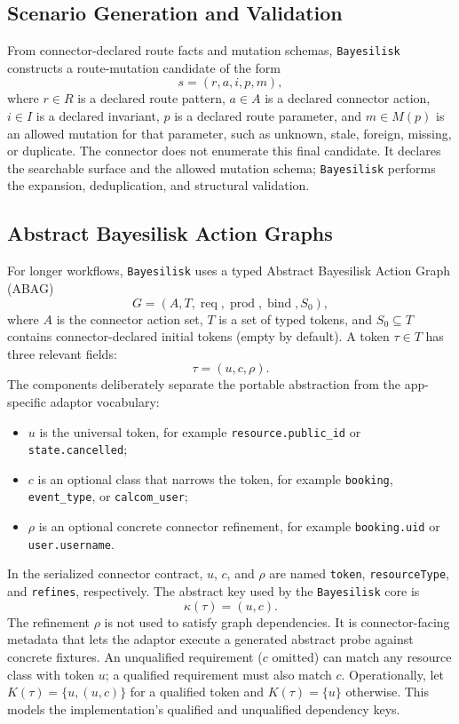 \documentclass[10pt]{article}
\newcommand{\tool}{\texttt{Bayesilisk}\xspace}
\begin{document}
\subsection{Scenario Generation and Validation}

From connector-declared route facts and mutation schemas, \tool constructs a
route-mutation candidate of the form
\[
  s = (r, a, i, p, m),
\]
where \(r \in R\) is a declared route pattern, \(a \in A\) is a declared
connector action, \(i \in I\) is a declared invariant, \(p\) is a declared route
parameter, and \(m \in M(p)\) is an allowed mutation for that parameter, such as
unknown, stale, foreign, missing, or duplicate. The connector does not enumerate
this final candidate. It declares the searchable surface and the allowed
mutation schema; \tool performs the expansion, deduplication, and structural
validation.

\subsection{Abstract Bayesilisk Action Graphs}

For longer workflows, \tool uses a typed Abstract Bayesilisk Action Graph
(ABAG)
\[
  G = (A,T,\operatorname{req},\operatorname{prod},\operatorname{bind},S_0),
\]
where \(A\) is the connector action set, \(T\) is a set of typed tokens, and
\(S_0\subseteq T\) contains connector-declared initial tokens (empty by default). A
token \(\tau \in T\) has three relevant fields:
\[
  \tau = (u,c,\rho).
\]
The components deliberately separate the portable abstraction from the
app-specific adaptor vocabulary:
\begin{itemize}
  \item \(u\) is the universal token, for example
        \texttt{resource.public\_id} or \texttt{state.cancelled};
  \item \(c\) is an optional class that narrows the token, for example
        \texttt{booking}, \texttt{event\_type}, or \texttt{calcom\_user};
  \item \(\rho\) is an optional concrete connector refinement, for example
        \texttt{booking.uid} or \texttt{user.username}.
\end{itemize}
In the serialized connector contract, \(u\), \(c\), and \(\rho\) are named
\texttt{token}, \texttt{resourceType}, and \texttt{refines}, respectively.
The abstract key used by the \tool core is
\[
  \kappa(\tau) = (u,c).
\]
The refinement \(\rho\) is not used to satisfy graph dependencies. It is
connector-facing metadata that lets the adaptor execute a generated abstract
probe against concrete fixtures. An unqualified requirement (\(c\) omitted) can
match any resource class with token \(u\); a qualified requirement must also
match \(c\). Operationally, let \(K(\tau)=\{u,(u,c)\}\) for a qualified token
and \(K(\tau)=\{u\}\) otherwise. This models the implementation's qualified and
unqualified dependency keys.
\end{document}
